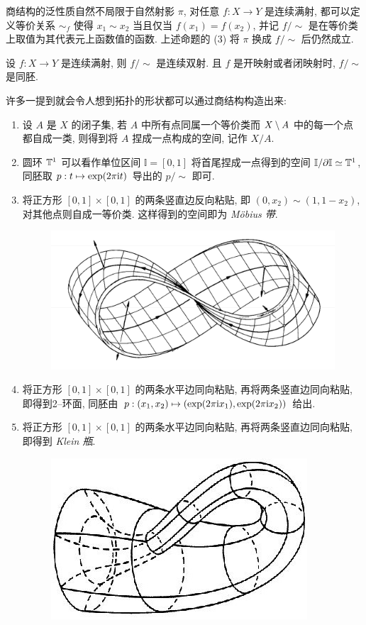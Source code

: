     商结构的泛性质自然不局限于自然射影 $ \pi $, 对任意 $ f : X\to Y $ 是连续满射, 都可以定义等价关系 $ \sim_f $ 使得 $ x_1\sim x_2 $ 当且仅当 $ f(x_1)=f(x_2) $, 并记 $ f/\sim $ 是在等价类上取值为其代表元上函数值的函数. 上述命题的 (3) 将 $ \pi $ 换成 $ f/\sim $ 后仍然成立.

    \begin{Proposition}
        设 $ f : X\to Y $ 是连续满射, 则 $ f/\sim $ 是连续双射. 且 $ f $ 是开映射或者闭映射时, $ f/\sim $ 是同胚.
    \end{Proposition}

    \begin{Example}
        许多一提到就会令人想到拓扑的形状都可以通过商结构构造出来:
        \begin{enumerate}
            \item 设 $ A $ 是 $ X $ 的闭子集, 若 $ A $ 中所有点同属一个等价类而 $ X\setminus A $ 中的每一个点都自成一类, 则得到将 $ A $ 捏成一点构成的空间, 记作 $ X/A $.
            \item 圆环 $ \mathbb{T}^1 $ 可以看作单位区间 $ \mathbb{I}=[0,1] $ 将首尾捏成一点得到的空间 $ \mathbb{I}/\partial\mathbb{I}\simeq\mathbb{T}^1 $, 同胚取 $ p : t\mapsto\exp(2\pi\mathrm{i} t) $ 导出的 $ p/\sim $ 即可.
            \item 将正方形 $ [0,1]\times[0,1] $ 的两条竖直边反向粘贴, 即 $ (0,x_2)\sim(1,1-x_2) $, 对其他点则自成一等价类. 这样得到的空间即为 \emph{M\"obius 带}.
            \begin{figure}[!htb]
                \centering
                \includegraphics[width=0.4\linewidth]{figures/Mobius_strip.jpg}
            \end{figure}
            \item 将正方形 $ [0,1]\times[0,1] $ 的两条水平边同向粘贴, 再将两条竖直边同向粘贴, 即得到2--环面, 同胚由 $ p: (x_1,x_2)\mapsto(\exp(2\pi\mathrm{i} x_1),\exp(2\pi\mathrm{i} x_2)) $ 给出.
            \item 将正方形 $ [0,1]\times[0,1] $ 的两条水平边同向粘贴, 再将两条竖直边同向粘贴, 即得到 \emph{Klein 瓶}.
            \begin{figure}[!htb]
                \centering
                \includegraphics[width=0.25\linewidth]{figures/Klein_bottle.jpg}
            \end{figure}
        \end{enumerate}
    \end{Example}

